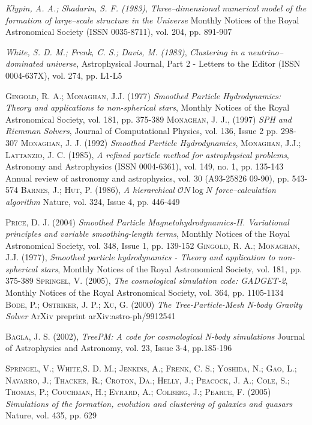 \documentclass[a4paper,openright,12pt]{book}
\begin{document}
\begin{thebibliography}{a}
 \textit{Klypin, A. A.; Shadarin, S. F. (1983)},
\textit{Three--dimensional numerical model of the formation of large--scale structure in the Universe}
Monthly Notices of the Royal Astronomical Society (ISSN 0035-8711), vol. 204, pp. 891-907

 \textit{White, S. D. M.; Frenk, C. S.; Davis, M. (1983)},
\textit{Clustering in a neutrino--dominated universe},
Astrophysical Journal, Part 2 - Letters to the Editor (ISSN 0004-637X), vol. 274, pp. L1-L5


 \textsc{Gingold, R. A.; Monaghan, J.J. (1977)}
\textit{Smoothed Particle Hydrodynamics: Theory and applications to non-spherical stars},
Monthly Notices of the Royal Astronomical Society, vol. 181, pp. 375-389
 \textsc{Monaghan, J. J., (1997)}
\textit{SPH and Riemman Solvers},
Journal of Computational Physics, vol. 136, Issue 2 pp. 298-307 
 \textsc{Monaghan, J. J. (1992)}
\textit{Smoothed Particle Hydrodynamics},
 \textsc{Monaghan, J.J.; Lattanzio, J. C. (1985)},
\textit{A refined particle method for astrophysical problems},
Astronomy and Astrophysics (ISSN 0004-6361), vol. 149, no. 1, pp. 135-143
Annual review of astronomy and astrophysics, vol. 30 (A93-25826 09-90), pp. 543-574
 \textsc{Barnes, J.; Hut, P. (1986)},
\textit{A hierarchical $\mathcal{O}N\log N$ force--calculation algorithm}
Nature, vol. 324, Issue 4, pp. 446-449

 \textsc{Price, D. J. (2004)}
\textit{Smoothed Particle Magnetohydrodynamics-II. Variational principles and variable smoothing-length terms},
Monthly Notices of the Royal Astronomical Society, vol. 348, Issue 1, pp. 139-152
 \textsc{Gingold, R. A.; Monaghan, J.J. (1977)},
\textit{Smoothed particle hydrodynamics - Theory and application to non-spherical stars},
Monthly Notices of the Royal Astronomical Society, vol. 181, pp. 375-389
 \textsc{Springel, V. (2005)},
\textit{The cosmological simulation code: GADGET-2},
Monthly Notices of the Royal Astronomical Society, vol. 364, pp. 1105-1134
 \textsc{Bode, P.; Ostriker, J. P.; Xu, G. (2000)}
\textit{The Tree-Particle-Mesh N-body Gravity Solver}
ArXiv preprint arXiv:astro-ph/9912541 


 \textsc{Bagla, J. S. (2002)},
\textit{TreePM: A code for cosmological N-body simulations}
Journal of Astrophysics and Astronomy, vol. 23, Issue 3-4, pp.185-196

 \textsc{Springel, V.; White,S. D. M.; Jenkins, A.; Frenk, C. S.; Yoshida, N.; Gao, L.; Navarro, J.; Thacker, R.; Croton, Da.; Helly, J.; Peacock, J. A.; Cole, S.; Thomas, P.; Couchman, H.; Evrard, A.; Colberg, J.; Pearce, F. (2005)}
\textit{Simulations of the formation, evolution and clustering of galaxies and quasars}
Nature, vol. 435, pp. 629


\end{thebibliography}
\end{document}
